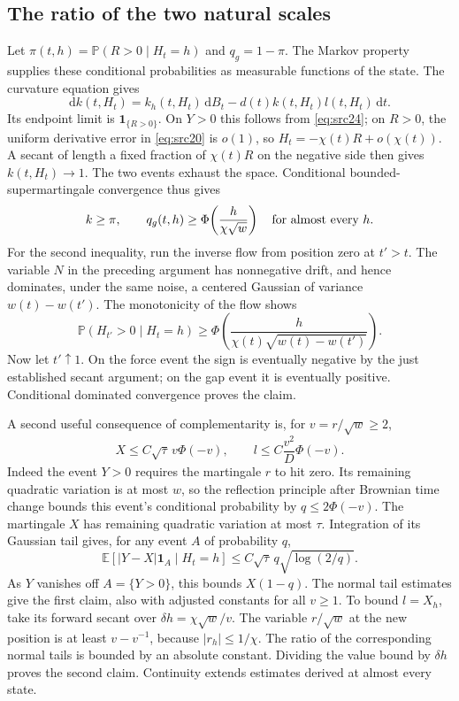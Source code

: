 \documentclass[11pt,a4paper]{article}
\numberwithin{equation}{section}
\theoremstyle{definition}
\theoremstyle{remark}
\newcommand{\E}{\mathbb E}
\newcommand{\Prob}{\mathbb P}
\newcommand{\dd}{\mathrm d}
\newcommand{\ind}{\mathbf 1}
\begin{document}
\subsection{The ratio of the two natural scales}

Let
$\pi(t,h)=\Prob(R>0\mid H_t=h)$ and $q_g=1-\pi$.
The Markov property supplies these conditional probabilities as
measurable functions of the state. The curvature equation gives
\[
 \dd k(t,H_t)=k_h(t,H_t)\,\dd B_t-d(t)k(t,H_t)l(t,H_t)\,\dd t.
\]
Its endpoint limit is $\ind_{\{R>0\}}$. On $Y>0$ this follows from
\eqref{eq:src24}; on $R>0$, the uniform derivative error in
\eqref{eq:src20} is $o(1)$, so
$H_t=-\chi(t)R+o(\chi(t))$. A secant of length a fixed fraction of
$\chi(t)R$ on the negative side then gives $k(t,H_t)\to1$.
The two events exhaust the space. Conditional bounded-supermartingale
convergence thus gives
\begin{equation}\label{eq:scale-probability-comparison}
 k\ge\pi,\qquad
 q_g(t,h)\ge\Phi\!\left(\frac{h}{\chi\sqrt w}\right)
 \quad\hbox{for almost every }h.
\end{equation}
For the second inequality, run the inverse flow from position zero at
$t'>t$. The variable $N$ in the preceding argument has nonnegative
drift, and hence dominates, under the same noise, a centered Gaussian
of variance $w(t)-w(t')$. The monotonicity of the flow shows
\[
 \Prob(H_{t'}>0\mid H_t=h)
 \ge\Phi\!\left(\frac{h}{\chi(t)\sqrt{w(t)-w(t')}}\right).
\]
Now let $t'\uparrow1$. On the force event the sign is eventually
negative by the just established secant argument; on the gap event it
is eventually positive. Conditional dominated convergence proves the
claim.

A second useful consequence of complementarity is, for
$v=r/\sqrt w\ge2$,
\begin{equation}\label{eq:src26}
 X\le C\sqrt\tau\,v\Phi(-v),\qquad
 l\le C\frac{v^2}{D}\Phi(-v).
\end{equation}
Indeed the event $Y>0$ requires the martingale $r$ to hit zero. Its
remaining quadratic variation is at most $w$, so the reflection
principle after Brownian time change bounds this event's conditional
probability by $q\le2\Phi(-v)$. The martingale $X$ has remaining
quadratic variation at most $\tau$. Integration of its Gaussian tail
gives, for any event $A$ of probability $q$,
\[
 \E[|Y-X|\ind_A\mid H_t=h]
 \le C\sqrt\tau\,q\sqrt{\log(2/q)}.
\]
As $Y$ vanishes off $A=\{Y>0\}$, this bounds
$X(1-q)$. The normal tail estimates give the first claim, also with
adjusted constants for all $v\ge1$. To bound $l=X_h$, take its forward
secant over $\delta h=\chi\sqrt w/v$. The variable $r/\sqrt w$ at the
new position is at least $v-v^{-1}$, because $|r_h|\le1/\chi$.
The ratio of the corresponding normal tails is bounded by an absolute
constant. Dividing the value bound by $\delta h$ proves the second
claim. Continuity extends estimates derived at almost every state.
\end{document}
